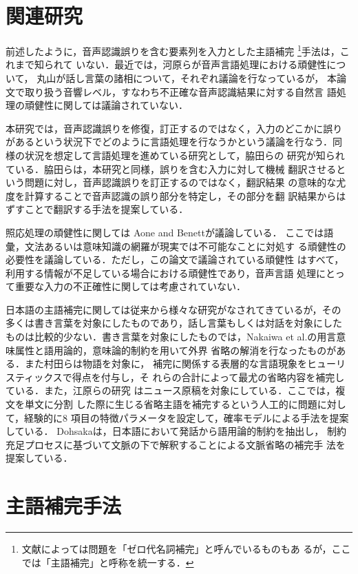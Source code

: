\section{関連研究}

前述したように，音声認識誤りを含む要素列を入力とした主語補完
{}\footnote{文献によっては問題を「ゼロ代名詞補完」と呼んでいるものもあ
るが，ここでは「主語補完」と呼称を統一する．}手法は，これまで知られて
いない．最近では，河原らが音声言語処理における頑健性について\cite{河原}，
丸山が話し言葉の諸相について\cite{丸山}，それぞれ議論を行なっているが，
本論文で取り扱う音響レベル，すなわち不正確な音声認識結果に対する自然言
語処理の頑健性に関しては議論されていない．

本研究では，音声認識誤りを修復，訂正するのではなく，入力のどこかに誤り
があるという状況下でどのように言語処理を行なうかという議論を行なう．同
様の状況を想定して言語処理を進めている研究として，脇田ら\cite{脇田}の
研究が知られている．脇田らは，本研究と同様，誤りを含む入力に対して機械
翻訳させるという問題に対し，音声認識誤りを訂正するのではなく，翻訳結果
の意味的な尤度を計算することで音声認識の誤り部分を特定し，その部分を翻
訳結果からはずすことで翻訳する手法を提案している．

照応処理の頑健性に関しては Aone and Benett\cite{Aone}が議論している．
ここでは語彙，文法あるいは意味知識の網羅が現実では不可能なことに対処す
る頑健性の必要性を議論している．ただし，この論文で議論されている頑健性
はすべて，利用する情報が不足している場合における頑健性であり，音声言語
処理にとって重要な入力の不正確性に関しては考慮されていない．

日本語の主語補完に関しては従来から様々な研究がなされてきているが，その
多くは書き言葉を対象にしたものであり，話し言葉もしくは対話を対象にした
ものは比較的少ない．書き言葉を対象にしたものでは，Nakaiwa et
al.{}\cite{Nakaiwa}の用言意味属性と語用論的，意味論的制約を用いて外界
省略の解消を行なったものがある．また村田ら\cite{村田}は物語を対象に，
補完に関係する表層的な言語現象をヒューリスティックスで得点を付与し，そ
れらの合計によって最尤の省略内容を補完している．また，江原らの研究
\cite{江原}はニュース原稿を対象にしている．ここでは，複文を単文に分割
した際に生じる省略主語を補完するという人工的に問題に対して，経験的に8
項目の特徴パラメータを設定して，確率モデルによる手法を提案している．
Dohsaka{}\cite{Dohsaka}は，日本語において発話から語用論的制約を抽出し，
制約充足プロセスに基づいて文脈の下で解釈することによる文脈省略の補完手
法を提案している．



\section{主語補完手法}

